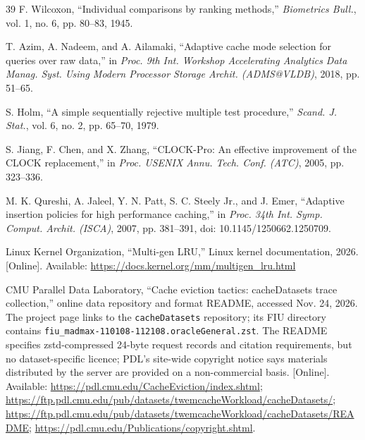 \documentclass[10pt,twocolumn,a4paper]{IEEEtran}
\begin{document}
\begin{thebibliography}{39}
 F. Wilcoxon, ``Individual comparisons by ranking methods,''
\emph{Biometrics Bull.}, vol. 1, no. 6, pp. 80--83, 1945.

 T. Azim, A. Nadeem, and A. Ailamaki, ``Adaptive cache mode
selection for queries over raw data,'' in \emph{Proc. 9th Int. Workshop
Accelerating Analytics Data Manag. Syst. Using Modern Processor Storage Archit.
(ADMS@VLDB)}, 2018, pp. 51--65.

 S. Holm, ``A simple sequentially rejective multiple test
procedure,'' \emph{Scand. J. Stat.}, vol. 6, no. 2, pp. 65--70, 1979.

 S. Jiang, F. Chen, and X. Zhang, ``CLOCK-Pro: An effective
improvement of the CLOCK replacement,'' in \emph{Proc. USENIX Annu. Tech. Conf.
(ATC)}, 2005, pp. 323--336.

 M. K. Qureshi, A. Jaleel, Y. N. Patt, S. C. Steely Jr., and J.
Emer, ``Adaptive insertion policies for high performance caching,'' in
\emph{Proc. 34th Int. Symp. Comput. Archit. (ISCA)}, 2007, pp. 381--391, doi:
10.1145/1250662.1250709.

 Linux Kernel Organization, ``Multi-gen LRU,'' Linux kernel
documentation, 2026. [Online]. Available:
\url{https://docs.kernel.org/mm/multigen_lru.html}

 CMU Parallel Data Laboratory, ``Cache eviction tactics:
cacheDatasets trace collection,'' online data repository and format README,
accessed Nov. 24, 2026. The project page links to the \texttt{cacheDatasets}
repository; its FIU directory contains
\texttt{fiu\_madmax-110108-112108.oracleGeneral.zst}. The README specifies
zstd-compressed 24-byte request records and citation requirements, but no
dataset-specific licence; PDL's site-wide copyright notice says materials
distributed by the server are provided on a non-commercial basis. [Online].
Available: \url{https://pdl.cmu.edu/CacheEviction/index.shtml};
\url{https://ftp.pdl.cmu.edu/pub/datasets/twemcacheWorkload/cacheDatasets/};
\url{https://ftp.pdl.cmu.edu/pub/datasets/twemcacheWorkload/cacheDatasets/README};
\url{https://pdl.cmu.edu/Publications/copyright.shtml}.

\end{thebibliography}
\end{document}
